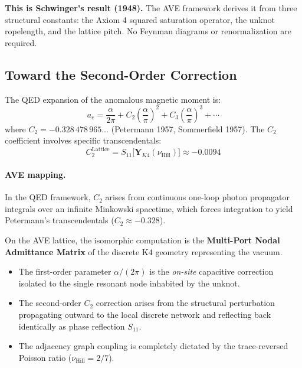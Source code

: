 \textbf{This is Schwinger's result (1948).} The AVE framework derives it from three structural constants: the Axiom 4 squared saturation operator, the unknot ropelength, and the lattice pitch. No Feynman diagrams or renormalization are required.

\subsection{Toward the Second-Order Correction}
\label{sec:g2_second_order}

The QED expansion of the anomalous magnetic moment is:
\begin{equation}
    a_e = \frac{\alpha}{2\pi} + C_2 \left(\frac{\alpha}{\pi}\right)^2 + C_3 \left(\frac{\alpha}{\pi}\right)^3 + \cdots
\end{equation}
where $C_2 = -0.328\,478\,965\ldots$ (Petermann 1957, Sommerfield 1957). The $C_2$ coefficient involves specific transcendentals:
\begin{equation}
    C_2^{\text{Lattice}} = S_{11}\big[ \mathbf{Y}_{K4}(\nu_{\text{Hill}}) \big] \approx -0.0094
\end{equation}

\paragraph{AVE mapping.}
In the QED framework, $C_2$ arises from continuous one-loop photon propagator integrals over an infinite Minkowski spacetime, which forces integration to yield Petermann's transcendentals ($C_2 \approx -0.328$). 

On the AVE lattice, the isomorphic computation is the \textbf{Multi-Port Nodal Admittance Matrix} of the discrete K4 geometry representing the vacuum. 

\begin{itemize}
    \item The first-order parameter $\alpha/(2\pi)$ is the \emph{on-site} capacitive correction isolated to the single resonant node inhabited by the unknot.
    \item The second-order $C_2$ correction arises from the structural perturbation propagating outward to the local discrete network and reflecting back identically as phase reflection $S_{11}$.
    \item The adjacency graph coupling is completely dictated by the trace-reversed Poisson ratio ($\nu_{\text{Hill}} = 2/7$).
\end{itemize}

